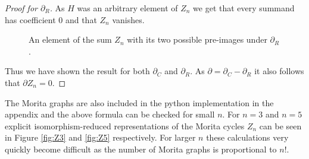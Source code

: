 \begin{proof}[Proof for $\partial_{R}$]
	As $H$ was an arbitrary element of $Z_{n}$ we get that every summand has coefficient $0$ and that $Z_{n}$ vanishes.

	\begin{figure}
		\centering
		\caption{An element of the sum $Z_{n}$ with its two possible pre-images under $\partial_{R}$.}
		\label{fig:MoritaCycleDR}
	\end{figure}
	Thus we have shown the result for both $\partial_{C}$ and $\partial_{R}$. As $\partial = \partial_{C} - \partial_{R}$ it also follows that $\partial Z_{n} = 0$.
\end{proof}

\begin{remark}
	The Morita graphs are also included in the python implementation in the appendix and the above formula can be checked for small $n$.
	For $n=3$ and $n=5$ explicit isomorphism-reduced representations of the Morita cycles $Z_{n}$ can be seen in Figure \ref{fig:Z3} and \ref{fig:Z5} respectively.
	For larger $n$ these calculations very quickly become difficult as the number of Morita graphs is proportional to $n!$.
\end{remark}

